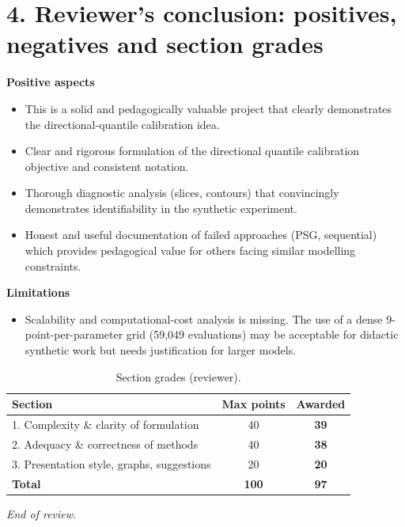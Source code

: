 \documentclass[11pt]{article}
\begin{document}
	\section*{4. Reviewer’s conclusion: positives, negatives and section grades}
	\textbf{Positive aspects}
	\begin{itemize}
		\item This is a solid and pedagogically valuable project that clearly demonstrates the directional-quantile calibration idea.
		\item Clear and rigorous formulation of the directional quantile calibration objective and consistent notation.
		\item Thorough diagnostic analysis (slices, contours) that convincingly demonstrates identifiability in the synthetic experiment.
		\item Honest and useful documentation of failed approaches (PSG, sequential) which provides pedagogical value for others facing similar modelling constraints.
	\end{itemize}
	
	\textbf{Limitations}
	\begin{itemize}
		\item Scalability and computational-cost analysis is missing. The use of a dense 9-point-per-parameter grid (59,049 evaluations) may be acceptable for didactic synthetic work but needs justification for larger models.
		
	\end{itemize}
	
	\bigskip
	\begin{table}[h!]
		\centering
		\begin{tabular}{@{}lcc@{}}
			\toprule
			Section & Max points & Awarded \\ \midrule
			1. Complexity \& clarity of formulation & 40 & \textbf{39} \\
			2. Adequacy \& correctness of methods & 40 & \textbf{38} \\
			3. Presentation style, graphs, suggestions & 20 & \textbf{20} \\ \midrule
			\textbf{Total} & \textbf{100} & \textbf{97} \\ \bottomrule
		\end{tabular}
		\caption{Section grades (reviewer).}
	\end{table}
	
	\vfill
	\noindent\textit{End of review.}
	
\end{document}
